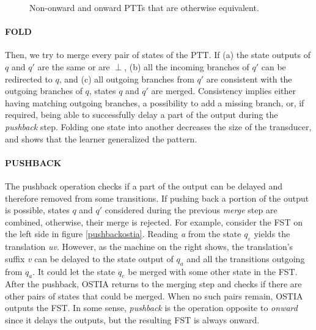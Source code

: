 \begin{figure}[h!] 
\centering
{}
%
\hspace{3em}
%
\caption{Non-onward and onward PTTs that are otherwise equivalent.}
\label{onwardgfsts}
\end{figure}



\paragraph{FOLD}

Then, we try to merge every pair of states of the PTT.
If (a) the state outputs of $q$ and $q'$ are the same or are $\perp$, (b) all the incoming branches of $q'$ can be redirected to $q$, and (c) all outgoing branches from $q'$ are consistent with the outgoing branches of $q$, states $q$ and $q'$ are merged.
Consistency implies either having matching outgoing branches, a possibility to add a missing branch, or, if required, being able to successfully delay a part of the output during the \emph{pushback} step.
Folding one state into another decreases the size of the transducer, and shows that the learner generalized the pattern.


\paragraph{PUSHBACK}

The pushback operation checks if a part of the output can be delayed and therefore removed from some transitions.
If pushing back a portion of the output is possible, states $q$ and $q'$ considered during the previous \emph{merge} step are combined, otherwise, their merge is rejected.
For example, consider the FST on the left side in figure \ref{pushbackostia}.
Reading \emph{a} from the state $q_\varepsilon$ yields the translation \emph{uv}.
However, as the machine on the right shows, the translation's suffix \emph{v} can be delayed to the state output of $q_a$ and all the transitions outgoing from $q_a$.
It could let the state $q_e$ be merged with some other state in the FST.
After the pushback, OSTIA returns to the merging step and checks if there are other pairs of states that could be merged.
When no such pairs remain, OSTIA outputs the FST.
In some sense, \emph{pushback} is the operation opposite to \emph{onward} since it delays the outputs, but the resulting FST is always onward.

